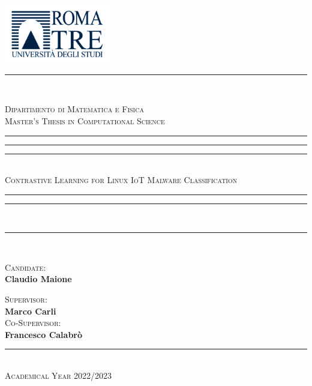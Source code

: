 \begin{titlepage}


\pagestyle{empty}

\begin{center}
\includegraphics[width=0.35\textwidth]{Images/logo.jpg}
\\
\rule{0.45\textwidth}{0.8pt} 
\\
\end{center}


\centering
\Large{\textsc{Dipartimento di Matematica e Fisica}}\\
\medskip
\large{\textsc{Master's Thesis in Computational Science}}
\vspace{0.4 cm}
\\
\rule{\textwidth}{0.8pt}

\vfill 

\rule{\textwidth}{1.6pt}\vspace*{-\baselineskip}\vspace*{2pt}
\rule{\textwidth}{0.4pt}\\[\baselineskip]
\huge{\textsc{Contrastive Learning for Linux IoT Malware Classification}}\\[0.02\baselineskip]
\rule{\textwidth}{0.4pt}\vspace*{-\baselineskip}\vspace*{3.2pt}
\rule{\textwidth}{1.6pt}\\[\baselineskip]

\vfill

\rule{\textwidth}{0.8pt}\\
\vspace{0.5cm}
\large
\begin{changemargin}{0cm}{0cm}
\begin{minipage}{0.3\textwidth}
\begin{flushleft}
\textsc{Candidate}: \\ \textbf{Claudio Maione}
\end{flushleft}
\end{minipage}
\hfill
\begin{minipage}{0.6\textwidth}
\begin{flushright}
\textsc{Supervisor}: \\
\textbf{Marco Carli} \\
\textsc{Co-Supervisor}: \\
\textbf{Francesco Calabrò}
\end{flushright}
\end{minipage}
\end{changemargin}
\vspace{0.5 cm}

\rule{0.4\textwidth}{0.8pt} \\

\vspace{0.2 cm}
\large{\textsc{Academical Year 2022/2023}}

\restoregeometry


\end{titlepage}

